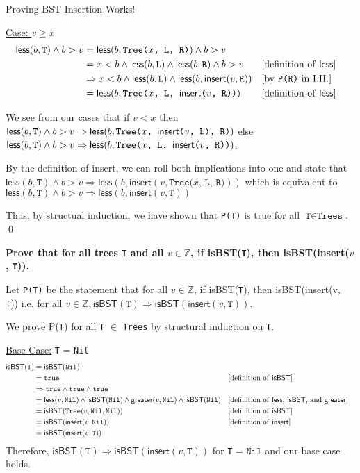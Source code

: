 \documentclass[11pt, nopagenumbers]{adamblan-hw}
\newcommand{\ZZ}{\mathbb{Z}}
\newcommand{\T}[1]{\texttt{#1}}
\newcommand{\Nil}{\texttt{Nil}}
\newcommand{\finsert}{\textsf{insert}}
\newcommand{\fless}{\textsf{less}}
\newcommand{\fgreater}{\textsf{greater}}
\newcommand{\fisBST}{\textsf{isBST}}
\begin{document}
\begin{question}{\color{red} Proving BST Insertion Works!}
\begin{part}
\underline{Case: $v \geq x$}  
\begin{align*}
\fless(b, \T{T}) \land b > v &= \fless(b, \T{Tree($x$, L, R)}) \land b > v\\
&= x < b \land \fless(b, \T{L}) \land \fless(b, \T{R}) \land b > v && \text{[definition of \fless]} \\
&\Rightarrow x < b \land \fless(b, \T{L}) \land \fless(b, \finsert(v, \T{R})) && \text{[by \T{P(R)} in I.H.]} \\
&= \fless(b, \T{Tree($x$, \T{L}, \finsert($v$, R))}) && \text{[definition of \fless]}
\end{align*}

We see from our cases that if $v < x$ then $\fless(b, \T{T}) \land b > v \Rightarrow \fless(b, \T{Tree($x$, \finsert($v$, \T{L}), R)})$
else $\fless(b, \T{T}) \land b > v \Rightarrow \fless(b, \T{Tree($x$, \T{L}, \finsert($v$, R))})$. 

By the definition of \finsert, we can roll both implications into one and state that 
$\fless(b, \T{T}) \land b > v \Rightarrow \fless(b, \finsert(v, \T{Tree($x$, L, R)}))$ which is equivalent
to $\fless(b, \T{T}) \land b > v \Rightarrow \fless(b, \finsert(v, \T{T}))$

Thus, by structual induction, we have shown that \T{P(T)} is true for all $\T{T} \in \T{Trees}$. \qed
\end{part}
\pagebreak
\begin{part} \textbf{Prove that for all trees \T{T} and all $v \in \ZZ$, if \fisBST(\T{T}),
    then \fisBST(\finsert($v$, \T{T})). }

Let \T{P(T)} be the statement that for all $v \in \ZZ$, if \fisBST(\T{T}), then
\fisBST(\finsert(v, \T{T})) i.e. for all $v \in \ZZ, \fisBST(\T{T}) \Rightarrow \fisBST(\finsert(v, \T{T}))$.

We prove P(\T{T}) for all \T{T} $\in$ \T{Trees} by structural induction on \T{T}. 

\underline{Base Case:} \T{T} = \Nil
\begin{align*}
\fisBST(\T{T}) &= \fisBST(\Nil) \\
&= \T{true} && \text{[definition of \fisBST]} \\
&\Rightarrow \T{true} \land \T{true} \land \T{true} \\
&= \fless(v, \Nil) \land \fisBST(\Nil) \land \fgreater(v, \Nil) \land \fisBST(\Nil) && \text{[definition of \fless, \fisBST, and \fgreater]} \\
&= \fisBST(\T{Tree}(v, \Nil, \Nil)) && \text{[definition of \fisBST]} \\
&= \fisBST(\finsert(v, \Nil)) && \text{[definition of \finsert]} \\
&= \fisBST(\finsert(v, \T{T}))
\end{align*}
Therefore, $\fisBST(\T{T}) \Rightarrow \fisBST(\finsert(v, \T{T}))$ for \T{T} = $\Nil$ and our base case holds.


\end{part}
\end{question}
\end{document}
